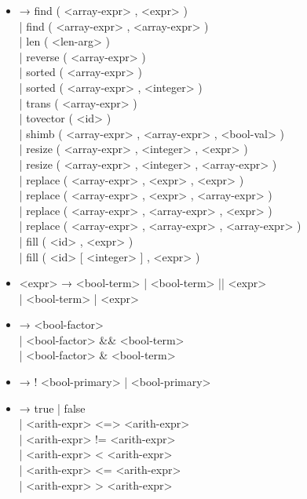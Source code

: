 \documentclass[a4paper,final]{article}
\begin{document}
\begin{itemize}
\begin{itemize}
\item <builtin-call> → find ( <array-expr> , <expr> )
                \\| find ( <array-expr> , <array-expr> )
                \\| len ( <len-arg> )
                \\| reverse ( <array-expr> )
                \\| sorted ( <array-expr> )
                \\| sorted ( <array-expr> , <integer> )
                \\| trans ( <array-expr> )
                \\| tovector ( <id> )
                \\| shimb ( <array-expr> , <array-expr> , <bool-val> )
                \\| resize ( <array-expr> , <integer> , <expr> )
                \\| resize ( <array-expr> , <integer> , <array-expr> )
                \\| replace ( <array-expr> , <expr> , <expr> )
                \\| replace ( <array-expr> , <expr> , <array-expr> )
                \\| replace ( <array-expr> , <array-expr> , <expr> )
                \\| replace ( <array-expr> , <array-expr> , <array-expr> )
                \\| fill ( <id> , <expr> )
                \\| fill ( <id> [ <integer> ] , <expr> )
\item <expr>         → <bool-term> | <bool-term> || <expr> \\| <bool-term> | <expr>
\item <bool-term>    → <bool-factor> \\| <bool-factor> \&\& <bool-term> \\| <bool-factor> \& <bool-term>
\item <bool-factor>  → ! <bool-primary> | <bool-primary>
\item <bool-primary> → true | false
                \\| <arith-expr> <=> <arith-expr>
                \\| <arith-expr> != <arith-expr>
                \\| <arith-expr> < <arith-expr>
                \\| <arith-expr> <= <arith-expr>
                \\| <arith-expr> > <arith-expr>

\end{itemize}
\end{itemize}
\end{document}
